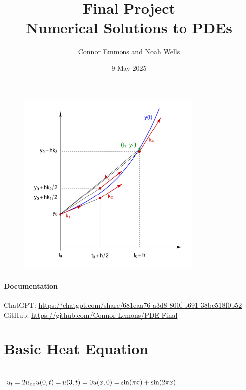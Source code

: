 \documentclass{article}
\title{Final Project\\Numerical Solutions to PDEs}
\date{9 May 2025}
\author{Connor Emmons and Noah Wells}
\begin{document}
\maketitle
\begin{figure}[h]
    \centering
    \includegraphics[width=0.8\textwidth]{title.jpg}
\end{figure}
\vfill
\paragraph*{Documentation}
ChatGPT: \url{https://chatgpt.com/share/681eaa76-a3d8-800f-b691-38bc518f0b52}
GitHub: \url{https://github.com/Connor-Lemons/PDE-Final}
\newpage
{}

\section{Basic Heat Equation}

\subsection*{$u_t = 2u_{xx}\\u(0,t) = u(3,t) = 0\\u(x,0) = \sin(\pi x) + \sin(2\pi x)$}
\end{document}
